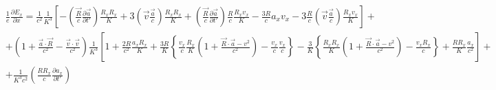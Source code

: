 \documentclass[11pt]{article}
\begin{document}
\[\begin{align}
  & \frac{1}{e}\frac{\partial {{E}_{x}}}{\partial x}=\frac{1}{{{c}^{2}}}\frac{1}{{{K}^{3}}}\left[ -\left( \frac{\overrightarrow{R}}{c}\frac{\partial \overrightarrow{a}}{\partial t'} \right)\frac{{{R}_{x}}{{R}_{x}}}{K}+3\left( \overrightarrow{v}\frac{\overrightarrow{a}}{c} \right)\frac{{{R}_{x}}{{R}_{x}}}{K}+\left( \frac{\overrightarrow{R}}{c}\frac{\partial \overrightarrow{a}}{\partial t'} \right)\frac{R}{c}\frac{{{R}_{x}}{{v}_{x}}}{K}-\frac{3R}{c}{{a}_{x}}{{v}_{x}}-3\frac{R}{c}\left( \overrightarrow{v}\frac{\overrightarrow{a}}{c} \right)\frac{{{R}_{x}}{{v}_{x}}}{K} \right]+ \\ 
 & +\left( 1+\frac{\overrightarrow{a}\cdot \overrightarrow{R}}{{{c}^{2}}}-\frac{\overrightarrow{v}\cdot \overrightarrow{v}}{{{c}^{2}}} \right)\frac{1}{{{K}^{3}}}\left[ 1+\frac{2R}{{{c}^{2}}}\frac{{{a}_{x}}{{R}_{x}}}{K}+\frac{3R}{K}\left\{ \frac{{{v}_{x}}}{c}\frac{{{R}_{x}}}{K}\left( 1+\frac{\overrightarrow{R}\cdot \overrightarrow{a}-{{v}^{2}}}{{{c}^{2}}} \right)-\frac{{{v}_{x}}}{c}\frac{{{v}_{x}}}{c} \right\}-\frac{3}{K}\left\{ \frac{{{R}_{x}}{{R}_{x}}}{K}\left( 1+\frac{\overrightarrow{R}\cdot \overrightarrow{a}-{{v}^{2}}}{{{c}^{2}}} \right)-\frac{{{v}_{x}}{{R}_{x}}}{c} \right\}+\frac{R{{R}_{x}}}{K}\frac{{{a}_{x}}}{{{c}^{2}}} \right]+ \\ 
 & +\frac{1}{{{K}^{3}}{{c}^{2}}}\left( \frac{R{{R}_{x}}}{c}\frac{\partial {{a}_{x}}}{\partial t'} \right) \\ 
\end{align}\]
\end{document}
